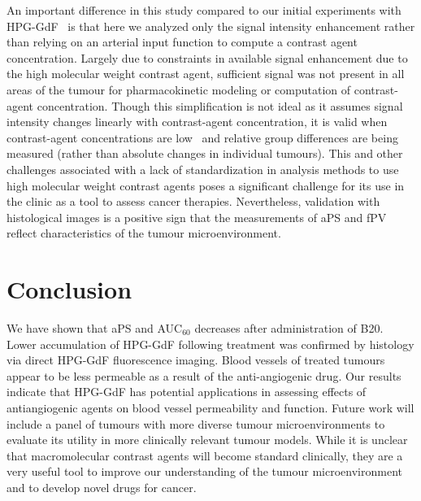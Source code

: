 An important difference in this study compared to our initial experiments with \acs{HPG-GdF}~\cite{Baker:2015cob} is that here we analyzed only the signal intensity enhancement rather than relying on an arterial input function to compute a contrast agent concentration.
Largely due to constraints in available signal enhancement due to the high molecular weight contrast agent, sufficient signal was not present in all areas of the tumour for pharmacokinetic modeling or computation of contrast-agent concentration.
Though this simplification is not ideal as it assumes signal intensity changes linearly with contrast-agent concentration, it is valid when contrast-agent concentrations are low~\cite{Heilmann:2006bm} and relative group differences are being measured (rather than absolute changes in individual tumours).
This and other challenges associated with a lack of standardization in analysis methods to use high molecular weight contrast agents poses a significant challenge for its use in the clinic as a tool to assess cancer therapies. 
Nevertheless, validation with histological images is a positive sign that the measurements of \acs{aPS} and \acs{fPV} reflect characteristics of the tumour microenvironment.

\section{Conclusion}

We have shown that \acs{aPS} and \acs{AUC}$_{60}$ decreases after administration of B20.
Lower accumulation of \acs{HPG-GdF} following treatment was confirmed by histology via direct \acs{HPG-GdF} fluorescence imaging.
Blood vessels of treated tumours appear to be less permeable as a result of the anti-angiogenic drug.
Our results indicate that \acs{HPG-GdF} has potential applications in assessing effects of antiangiogenic agents on blood vessel permeability and function.
Future work will include a panel of tumours with more diverse tumour microenvironments to evaluate its utility in more clinically relevant tumour models.
While it is unclear that macromolecular contrast agents will become standard clinically, they are a very useful tool to improve our understanding of the tumour microenvironment and to develop novel drugs for cancer.
\endinput